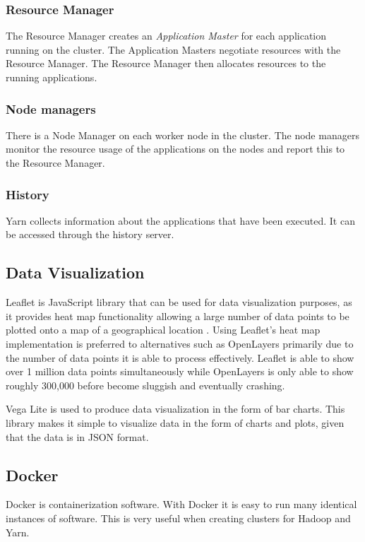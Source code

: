 \documentclass[main.tex]{subfiles}
\begin{document}
\subsubsection{Resource Manager}
The Resource Manager creates an \textit{Application Master} for each application running on the cluster. The Application Masters negotiate resources with the Resource Manager. The Resource Manager then allocates resources to the running applications.  

\subsubsection{Node managers}
There is a Node Manager on each worker node in the cluster. The node managers monitor the resource usage of the applications on the nodes and report this to the Resource Manager.

\subsubsection{History}
Yarn collects information about the applications that have been executed. It can be accessed through the history server.

\subsection{Data Visualization}
Leaflet is JavaScript library that can be used for data visualization purposes, as it provides heat map functionality allowing a large number of data points to be plotted onto a map of a geographical location \cite{Leaflet}. Using Leaflet's heat map implementation is preferred to alternatives such as OpenLayers primarily due to the number of data points it is able to process effectively. Leaflet is able to show over 1 million data points simultaneously while OpenLayers is only able to show roughly 300,000 before become sluggish and eventually crashing.  

Vega Lite is used to produce data visualization in the form of bar charts. This library makes it simple to visualize data in the form of charts and plots, given that the data is in JSON format. 

\subsection{Docker}
Docker is containerization software. With Docker it is easy to run many identical instances of software. This is very useful when creating clusters for Hadoop and Yarn. 
\end{document}
